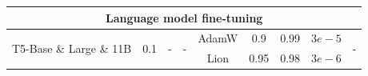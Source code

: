 \documentclass{article}
\newcommand{\name}{Lion}
\begin{document}
\begin{table}
{\begin{tabular}{lcccccccc}
    \multicolumn{9}{c}{Language model fine-tuning} \\ \midrule
    \multirow{2}{*}{T5-Base \& Large \& 11B} & \multirow{2}{*}{0.1} & \multirow{2}{*}{-} & \multirow{2}{*}{-} & AdamW & 0.9 & 0.99 & $3e-5$ & \multirow{2}{*}{-} \\
    & & & & \name & 0.95 & 0.98 & $3e-6$ & \\
    \bottomrule
    \end{tabular}}
    \label{tab:hyperparameter}
\end{table}
\end{document}

